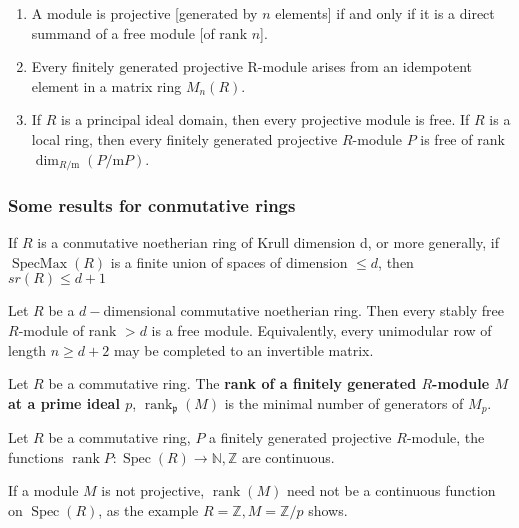 \begin{lemm}
 \begin{enumerate}
    \item A module is projective [generated by $n$ elements] if and only if it is a direct summand of a free module [of rank $n$].
    \item Every ﬁnitely generated projective R-module arises from an idempotent element in a matrix ring $M_n(R)$.
    \item If $R$ is a principal ideal domain, then every projective module is free.
If $R$ is a local ring, then every finitely generated projective $R$-module $P$ is free of rank $\operatorname{dim}_{R / \mathrm{m}}(P / \mathrm{m} P)$. 
 \end{enumerate}   
\end{lemm}


\subsubsection{Some results for conmutative rings}

\begin{theo}
    If $R$ is a conmutative noetherian ring of Krull dimension d, or more generally, if $\operatorname{SpecMax} (R)$ is a finite union of spaces of dimension $\leq d$, then $sr(R) \leq d+1$
\end{theo}

\begin{theo}
Let $R$ be a $d-$dimensional commutative noetherian ring. Then every stably free $R$-module of rank $>d$ is a free module. Equivalently, every unimodular row of length $n \geq d+2$ may be completed to an invertible matrix.
\end{theo}

Let $R$ be a commutative ring. The {\bfseries rank of a finitely generated $R$-module $M$ at a prime ideal $p$}, $\operatorname{rank}_\mathfrak{p}(M)$ is the minimal number of generators of $M_p$.

\begin{lemm}
 Let $R$ be a commutative ring, $P$ a finitely generated projective $R$-module, the functions $\operatorname{rank} P: \operatorname{Spec}(R) \rightarrow \mathbb{N}, \mathbb{Z}$ are continuous.
\end{lemm}

If a module $M$ is not projective, $\operatorname{rank}(M)$ need not be a continuous function on $\operatorname{Spec}(R)$, as the example $R=\mathbb{Z}, M=\mathbb{Z} / p$ shows.

